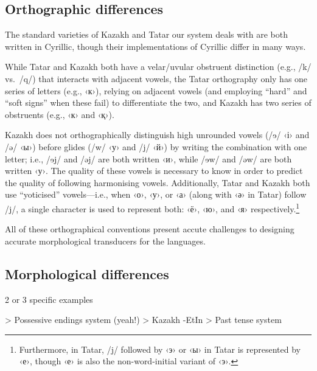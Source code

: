 \documentclass[11pt]{article}
\begin{document}
\subsection{Orthographic differences}
The standard varieties of Kazakh and Tatar our system deals with are both written in Cyrillic, though their implementations of Cyrillic differ in many ways.

While Tatar and Kazakh both have a velar/uvular obstruent distinction (e.g., /k/ vs.\ /q/) that interacts with adjacent vowels, the Tatar orthography only has one series of letters (e.g., ‹к›), relying on adjacent vowels (and employing ``hard'' and ``soft signs'' when these fail) to differentiate the two, and Kazakh has two series of obstruents (e.g., ‹к› and ‹қ›).

Kazakh does not orthographically distinguish high unrounded vowels (/{\qipa ɘ}/ ‹і› and /ə/ ‹ы›) before glides (/w/ ‹у› and /j/ ‹й›) by writing the combination with one letter; i.e., /{\qipa ɘ}j/ and /əj/ are both written ‹и›, while /{\qipa ɘ}w/ and /əw/ are both written ‹у›.  The quality of these vowels is necessary to know in order to predict the quality of following harmonising vowels. %
Additionally, Tatar and Kazakh both use ``yoticised'' vowels---i.e., when ‹о›, ‹у›, or ‹а› (along with ‹ә› in Tatar) follow /j/, a single character is used to represent both: ‹ё›, ‹ю›, and ‹я› respectively.\footnote{Furthermore, in Tatar, /j/ followed by ‹э› or ‹ы› in Tatar is represented by ‹е›, though ‹е› is also the non-word-initial variant of ‹э›.}  %

All of these orthographical conventions present accute challenges to designing accurate morphological transducers for the languages.

\subsection{Morphological differences}
2 or 3 specific examples

> Possessive endings system (yeah!)
> Kazakh -EtIn
> Past tense system

%
\end{document}
